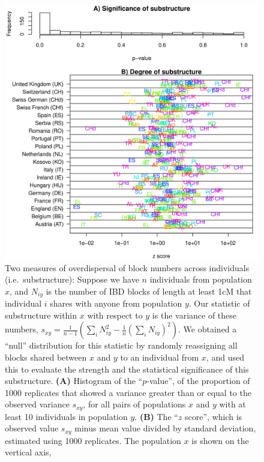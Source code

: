 \documentclass{article}
\begin{document}
\begin{figure}[!htp]
  \begin{center}
    \includegraphics[height=.7\textheight]{substructure_summaries}
    \caption{
    Two measures of overdispersal of block numbers across individuals (i.e.\ substructure):
    Suppose we have $n$ individuals from population $x$,
    and $N_{iy}$ is the number of IBD blocks of length at least 1cM
    that individual $i$ shares with anyone from population $y$.
    Our statistic of substructure within $x$ with respect to $y$ is the variance of these numbers,
    $s_{xy} = \frac{1}{n-1} \left( \sum_i N_{iy}^2 - \frac{1}{n} \left( \sum_i N_{iy} \right)^2 \right)$.
    We obtained a ``null'' distribution for this statistic by randomly reassigning all blocks shared between $x$ and $y$
    to an individual from $x$, and used this to evaluate the strength and the statistical significance of this substructure.
    {\bf (A)} Histogram of the ``$p$-value'', of the proportion of 1000 replicates that showed a variance greater than or equal to the observed variance $s_{xy}$,
    for all pairs of populations $x$ and $y$ with at least 10 individuals in population $y$.
    {\bf (B)} The ``$z$ score'', which is observed value $s_{xy}$ minus mean value divided by standard deviation,
    estimated using 1000 replicates.
    The population $x$ is shown on the vertical axis,
}
\end{center}
\end{figure}
\end{document}

